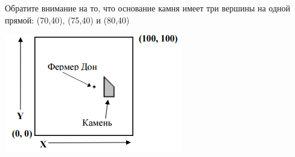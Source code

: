 Обратите внимание на то, что  основание камня имеет три  вершины на одной прямой:  (70,40), (75,40) и (80,40)

\includegraphics{boundary.png}
